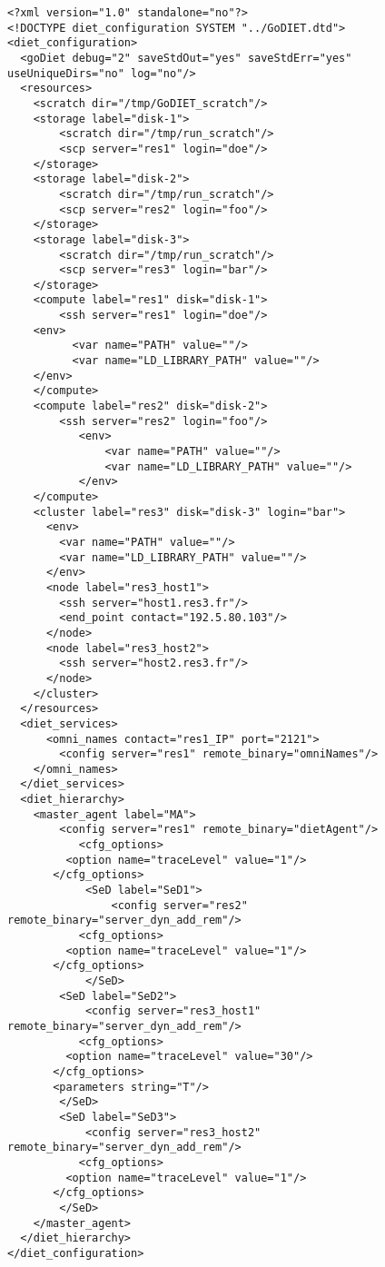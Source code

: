 


\begin{lstlisting}
<?xml version="1.0" standalone="no"?>
<!DOCTYPE diet_configuration SYSTEM "../GoDIET.dtd">
<diet_configuration>
  <goDiet debug="2" saveStdOut="yes" saveStdErr="yes" useUniqueDirs="no" log="no"/>
  <resources>
    <scratch dir="/tmp/GoDIET_scratch"/>
    <storage label="disk-1">
        <scratch dir="/tmp/run_scratch"/>
        <scp server="res1" login="doe"/>
    </storage>
    <storage label="disk-2">
        <scratch dir="/tmp/run_scratch"/>
        <scp server="res2" login="foo"/>
    </storage>
    <storage label="disk-3">
        <scratch dir="/tmp/run_scratch"/>
        <scp server="res3" login="bar"/>
    </storage>
    <compute label="res1" disk="disk-1">
        <ssh server="res1" login="doe"/>
	<env>
	      <var name="PATH" value=""/>
	      <var name="LD_LIBRARY_PATH" value=""/>
	</env>
    </compute>
    <compute label="res2" disk="disk-2">
        <ssh server="res2" login="foo"/>
	       <env>
		       <var name="PATH" value=""/>
		       <var name="LD_LIBRARY_PATH" value=""/>
	       </env>
    </compute>
	<cluster label="res3" disk="disk-3" login="bar">
      <env> 
      	<var name="PATH" value=""/>
        <var name="LD_LIBRARY_PATH" value=""/>
      </env>
      <node label="res3_host1">
        <ssh server="host1.res3.fr"/> 
        <end_point contact="192.5.80.103"/>
      </node>
      <node label="res3_host2">
        <ssh server="host2.res3.fr"/>
      </node>
    </cluster>
  </resources>
  <diet_services>
	  <omni_names contact="res1_IP" port="2121">
        <config server="res1" remote_binary="omniNames"/>
    </omni_names>
  </diet_services>
  <diet_hierarchy>
    <master_agent label="MA">
        <config server="res1" remote_binary="dietAgent"/>
           <cfg_options>
	     <option name="traceLevel" value="1"/>
	   </cfg_options>
            <SeD label="SeD1">
                <config server="res2" remote_binary="server_dyn_add_rem"/>
           <cfg_options>
	     <option name="traceLevel" value="1"/>
	   </cfg_options>
            </SeD>
        <SeD label="SeD2">
            <config server="res3_host1" remote_binary="server_dyn_add_rem"/>
           <cfg_options>
	     <option name="traceLevel" value="30"/>
	   </cfg_options>
	   <parameters string="T"/>
        </SeD>
        <SeD label="SeD3">
            <config server="res3_host2" remote_binary="server_dyn_add_rem"/>
           <cfg_options>
	     <option name="traceLevel" value="1"/>
	   </cfg_options>
        </SeD>
    </master_agent>
  </diet_hierarchy>      
</diet_configuration>
\end{lstlisting}